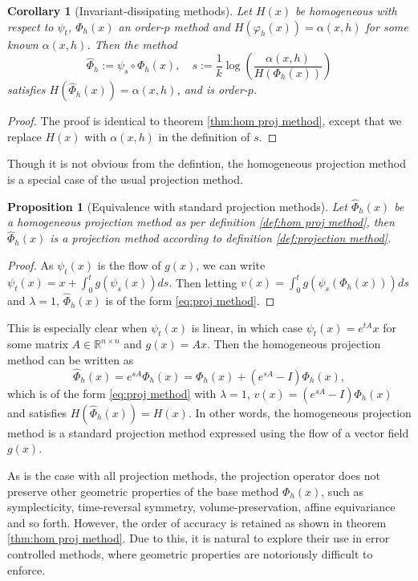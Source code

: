 \documentclass[final,3p,times]{elsarticle}
\newtheorem{corollary}[theorem]{Corollary}
\newtheorem{proposition}[theorem]{Proposition}
\newcommand{\R}{\mathbb{R}}
\begin{document}
\begin{corollary}[Invariant-dissipating methods]
  Let $H(x)$ be homogeneous with respect to $\psi_t$, $\Phi_h(x)$ an order-$p$ method and $ H(\varphi_h(x))=\alpha(x, h)$ for some known $\alpha(x, h)$. Then the method
  $$
    \widehat\Phi_{h}:=\psi_{s}\circ\Phi_h(x), \quad s:= \frac{1}{k}\log\left(\frac{\alpha(x, h)}{H(\Phi_h(x))}\right)
  $$
  satisfies $H(\widehat\Phi_{h}(x)) = \alpha(x, h)$, and is order-$p$.
\end{corollary}
\begin{proof}
  The proof is identical to theorem \ref{thm:hom proj method}, except that we replace $H(x)$ with $\alpha(x, h)$ in the definition of $s$.
\end{proof}
Though it is not obvious from the defintion, the homogeneous projection method is a special case of the usual projection method.
\begin{proposition}[Equivalence with standard projection methods]
  Let $\widehat{\Phi}_h(x)$ be a homogeneous projection method as per definition \ref{def:hom proj method}, then $\widehat{\Phi}_h(x)$ is a projection method according to definition \ref{def:projection method}. 
\end{proposition}
\begin{proof}
  As $\psi_t(x)$ is the flow of $g(x)$, we can write $\psi_t(x) = x + \int_0^t g(\psi_s(x)) ds.$ Then letting $v(x) = \int_0^t g(\psi_s(\Phi_h(x))) ds$ and $\lambda=1$, $\widehat{\Phi}_h(x)$ is of the form \eqref{eq:proj method}. 
\end{proof}
This is especially clear when $\psi_t(x)$ is linear, in which case $\psi_t(x) = e^{tA}x$ for some matrix $A\in\R^{n\times n}$ and $g(x) = Ax$. Then the homogeneous projection method can be written as
$$\widehat{\Phi}_h(x) = e^{sA}\Phi_h(x) = \Phi_h(x) + (e^{sA}-I)\Phi_h(x),$$
which is of the form \eqref{eq:proj method} with $\lambda=1$, $v(x) = (e^{sA}-I)\Phi_h(x)$ and satisfies $H(\widehat{\Phi}_h(x)) = H(x)$. In other words, the homogeneous projection method is a standard projection method expressed using the flow of a vector field $g(x)$.

As is the case with all projection methods, the projection operator does not preserve other geometric properties of the base method $\Phi_h(x)$, such as symplecticity, time-reversal symmetry, volume-preservation, affine equivariance and so forth. However, the order of accuracy is retained as shown in theorem \ref{thm:hom proj method}. Due to this, it is natural to explore their use in error controlled methods, where geometric properties are notoriously difficult to enforce. 
\end{document}

